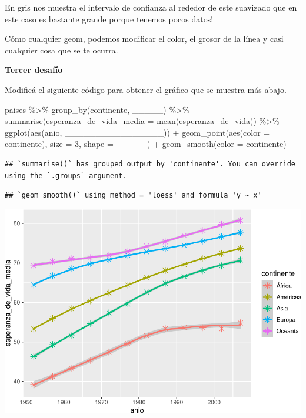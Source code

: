 \documentclass[
  openany]{book}
\newenvironment{Shaded}{\begin{snugshade}}{\end{snugshade}}
\newcommand{\AttributeTok}[1]{\textcolor[rgb]{0.77,0.63,0.00}{#1}}
\newcommand{\DecValTok}[1]{\textcolor[rgb]{0.00,0.00,0.81}{#1}}
\newcommand{\FunctionTok}[1]{\textcolor[rgb]{0.00,0.00,0.00}{#1}}
\newcommand{\NormalTok}[1]{#1}
\newcommand{\SpecialCharTok}[1]{\textcolor[rgb]{0.00,0.00,0.00}{#1}}
\begin{document}
En gris nos muestra el intervalo de confianza al rededor de este suavizado que en este caso es bastante grande porque tenemos pocos datos!

Cómo cualquier geom, podemos modificar el color, el grosor de la línea y casi cualquier cosa que se te ocurra.

\textbf{Tercer desafío}

Modificá el siguiente código para obtener el gráfico que se muestra más abajo.

\begin{Shaded}
\begin{Highlighting}[]
\NormalTok{paises }\SpecialCharTok{\%\textgreater{}\%} 
  \FunctionTok{group\_by}\NormalTok{(continente, \_\_\_\_\_) }\SpecialCharTok{\%\textgreater{}\%} 
  \FunctionTok{summarise}\NormalTok{(}\AttributeTok{esperanza\_de\_vida\_media =} \FunctionTok{mean}\NormalTok{(esperanza\_de\_vida)) }\SpecialCharTok{\%\textgreater{}\%} 
  \FunctionTok{ggplot}\NormalTok{(}\FunctionTok{aes}\NormalTok{(anio, \_\_\_\_\_\_\_\_\_\_\_\_\_\_\_\_)) }\SpecialCharTok{+}  
  \FunctionTok{geom\_point}\NormalTok{(}\FunctionTok{aes}\NormalTok{(}\AttributeTok{color =}\NormalTok{ continente), }\AttributeTok{size =} \DecValTok{3}\NormalTok{, }\AttributeTok{shape =}\NormalTok{ \_\_\_\_\_) }\SpecialCharTok{+}
  \FunctionTok{geom\_smooth}\NormalTok{(}\AttributeTok{color =}\NormalTok{ continente) }
\end{Highlighting}
\end{Shaded}

\begin{verbatim}
## `summarise()` has grouped output by 'continente'. You can override using the `.groups` argument.
\end{verbatim}

\begin{verbatim}
## `geom_smooth()` using method = 'loess' and formula 'y ~ x'
\end{verbatim}

\begin{center}\includegraphics[width=1\linewidth]{DT6_files/figure-latex/unnamed-chunk-58-1} \end{center}
\end{document}
